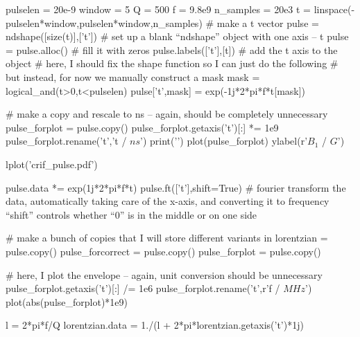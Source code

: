 \begin{python}
pulselen = 20e-9
window = 5 
Q = 500
f = 9.8e9
n_samples = 20e3
t = linspace(-pulselen*window,pulselen*window,n_samples) # make a t vector
pulse = ndshape([size(t)],['t']) # set up a blank ``ndshape'' object with one axis -- t
pulse = pulse.alloc() # fill it with zeros
pulse.labels(['t'],[t]) # add the t axis to the object
# here, I should fix the shape function so I can just do the following
# but instead, for now we manually construct a mask
mask = logical_and(t>0,t<pulselen)
pulse['t',mask] = exp(-1j*2*pi*f*t[mask])

# make a copy and rescale to ns -- again, should be completely unnecessary
pulse_forplot = pulse.copy()
pulse_forplot.getaxis('t')[:] *= 1e9
pulse_forplot.rename('t','t / $ns$')
print('\n\n')
plot(pulse_forplot)
ylabel(r'$B_1$ / $G$')

lplot('crif_pulse.pdf')

pulse.data *= exp(1j*2*pi*f*t)
pulse.ft(['t'],shift=True) # fourier transform the data, automatically taking care of the x-axis, and converting it to frequency ``shift'' controls whether ``0'' is in the middle or on one side

# make a bunch of copies that I will store different variants in
lorentzian = pulse.copy()
pulse_forcorrect = pulse.copy()
pulse_forplot = pulse.copy()

# here, I plot the envelope -- again, unit conversion should be unnecessary
pulse_forplot.getaxis('t')[:] /= 1e6
pulse_forplot.rename('t',r'f / $MHz$')
plot(abs(pulse_forplot)*1e9)

l = 2*pi*f/Q
lorentzian.data = 1./(l + 2*pi*lorentzian.getaxis('t')*1j)


\end{python}
